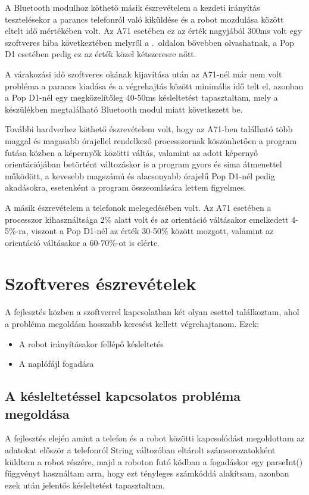\documentclass[]{thesis-ekf}
\theoremstyle{definition}
\begin{document}
A Bluetooth modulhoz köthető másik észrevételem a kezdeti irányítás tesztelésekor a parancs telefonról való kiküldése és a robot mozdulása között eltelt idő mértékében volt. Az A71 esetében ez az érték nagyjából 300ms volt egy szoftveres hiba következtében melyről a \pageref{lag}.~oldalon bővebben olvashatnak, a Pop D1 esetében pedig ez az érték közel kétszeresre nőtt.

A várakozási idő szoftveres okának kijavítása után az A71-nél már nem volt probléma a parancs kiadása és a végrehajtás között minimális idő telt el, azonban a Pop D1-nél egy megközelítőleg 40-50ms késleltetést tapasztaltam, mely a készülékben megtalálható Bluetooth modul miatt következett be.

További hardverhez köthető észrevételem volt, hogy az A71-ben található több maggal és magasabb órajellel rendelkező processzornak köszönhetően a program futása közben a képernyők közötti váltás, valamint az adott képernyő orientációjában betörtént változáskor is a program gyors és sima átmenettel működött, a kevesebb magszámú és alacsonyabb órajelű Pop D1-nél pedig akadásokra, esetenként a program összeomlására lettem figyelmes.

A másik észrevételem a telefonok melegedésében volt. Az A71 esetében a processzor kihasználtsága 2\% alatt volt és az orientáció váltásakor emelkedett 4-5\%-ra, viszont a Pop D1-nél az érték 30-50\% között mozgott, valamint az orientáció váltásakor a 60-70\%-ot is elérte.
\section{Szoftveres észrevételek}
A fejlesztés közben a szoftverrel kapcsolatban két olyan esettel találkoztam, ahol a probléma megoldása hosszabb keresést kellett végrehajtanom. Ezek:
\begin{itemize}
	\item A robot irányításakor fellépő késleltetés
	\item A naplófájl fogadása
\end{itemize}
\subsection{A késleltetéssel kapcsolatos probléma megoldása}\label{lag}
A fejlesztés elején amint a telefon és a robot közötti kapcsolódást megoldottam az adatokat először a telefonról String változóban eltárolt számsorozatokként küldtem a robot részére, majd a roboton futó kódban a fogadáskor egy parseInt() függvényt használtam arra, hogy ezt tényleges számkóddá alakítsam, azonban ezek után jelentős késleltetést tapasztaltam.
\end{document}
